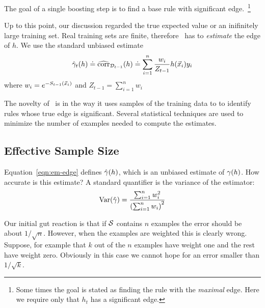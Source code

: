 The goal of a single boosting step is to find a base rule with
significant edge.~\footnote{Some times the goal is stated as
  finding the rule with the {\em maximal} edge.  Here we require only
  that $h_t$ has a significant edge.}

Up to this point, our discussion regarded the true expected value or
an inifinitely large training set. Real training sets are finite, 
therefore \Sparrow\ has to {\em
  estimate} the edge of $h$. We use the standard unbiased estimate
\begin{equation} \label{eqn:emp-edge}
\hat{\gamma}_{t}(h) \doteq \widehat{\mbox{corr}}_{{\cal D}_{t-1}}(h)
\doteq 
\sum_{i=1}^n \frac{w_i}{Z_{t-1}} h(\vec{x}_i) y_i
\end{equation}
where  $w_i = e^{-S_{t-1}(\vec{x}_i)}$ and $Z_{t-1} = \sum_{i=1}^n w_i$

The novelty of \Sparrow\ is in the way it uses samples of the training
data to to identify rules whose true edge is significant.
Several statistical techniques are used to minimize the number of
examples needed to compute the estimates.

\subsection{Effective Sample Size}
\label{sec:effectiveSampleSize}
Equation~\ref{eqn:em-edge} defines $\hat{\gamma}(h)$, which is an
unbiased estimate of $\gamma(h)$. How accurate is this estimate? A
standard quantifier is the variance of the estimator:
\begin{equation} \label{eqn:variance}
 \mbox{Var}(\hat{\gamma}) = \frac{\sum_{i=1}^n w_i^2}{\left(\sum_{i=1}^n w_i\right)^2}
\end{equation}



Our initial
gut reaction is that if ${\cal S}$ contains $n$ examples the error should be
about $1/\sqrt{n}$. However, when the examples are weighted this is
clearly wrong. Suppose, for example that $k$ out of the $n$ examples
have weight one and the rest have weight zero. Obviously in this case
we cannot hope for an error smaller than $1/\sqrt{k}$.


